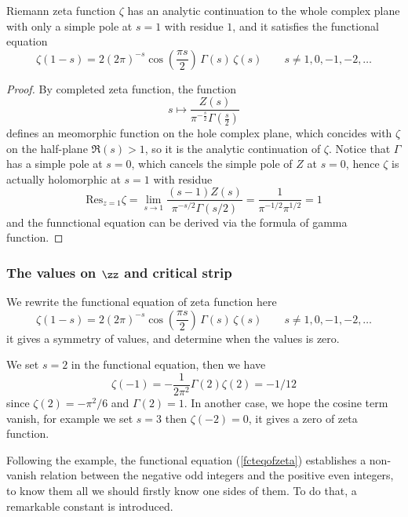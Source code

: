 \begin{colorcorollary}
    Riemann zeta function \(\zeta\) has an analytic continuation to the whole complex plane with only a simple pole at \(s = 1\) with residue \(1\), and it satisfies the functional equation
     \[\zeta(1-s) = 2(2\pi)^{-s} \cos(\frac{\pi s}{2}) \, \Gamma(s) \, \zeta(s) 
    \qquad  s\neq 1,0,-1,-2,\dots\]
\end{colorcorollary}

\begin{proof}
    By completed zeta function, the function
    \[s \mapsto \frac{Z(s)}{\pi^{-\frac{s}{2}} \Gamma\left(\frac{s}{2}\right)}\]
    defines an meomorphic function on the hole complex plane, which concides with \(\zeta\) on the half-plane \(\Re(s)>1\), so it is the analytic continuation of \(\zeta\). Notice that \(\Gamma\) has a simple pole at \(s = 0\), which cancels the simple pole of \(Z\) at \(s = 0\), hence \(\zeta\) is actually holomorphic at \(s = 1\) with residue
    \[\mathrm{Res}_{z=1} \zeta = \lim_{s \to 1}  \frac{(s-1)Z(s)}{\pi^{-s/2} \Gamma(s/2)} = \frac{1}{\pi^{-1/2} \pi^{1/2}} = 1\]
    and the funnctional equation can be derived via the formula of gamma function.
\end{proof}

\subsubsection{The values on \(\zz\) and critical strip}

We rewrite the functional equation of zeta function here
\begin{equation} \label{fcteqofzeta}
    \zeta(1-s) = 2(2\pi)^{-s} \cos(\frac{\pi s}{2}) \, \Gamma(s) \, \zeta(s) 
    \qquad  s\neq 1,0,-1,-2,\dots
\end{equation}
it gives a symmetry of values, and determine when the values is zero.

\begin{example}
    We set \(s= 2\) in the functional equation, then we have
    \[\zeta(-1) = - \frac{1}{2\pi^2} \Gamma(2) \zeta(2) = -1/12\]
    since \(\zeta(2) = -\pi^2/6\) and \(\Gamma(2) = 1\). In another case, we hope the cosine term vanish, for example we set \(s = 3\) then \(\zeta(-2) = 0\), it gives a zero of zeta function.
\end{example}

Following the example, the functional equation (\ref{fcteqofzeta}) establishes a non-vanish relation between the negative odd integers and the positive even integers, to know them all we should firstly know one sides of them. To do that, a remarkable constant is introduced.

